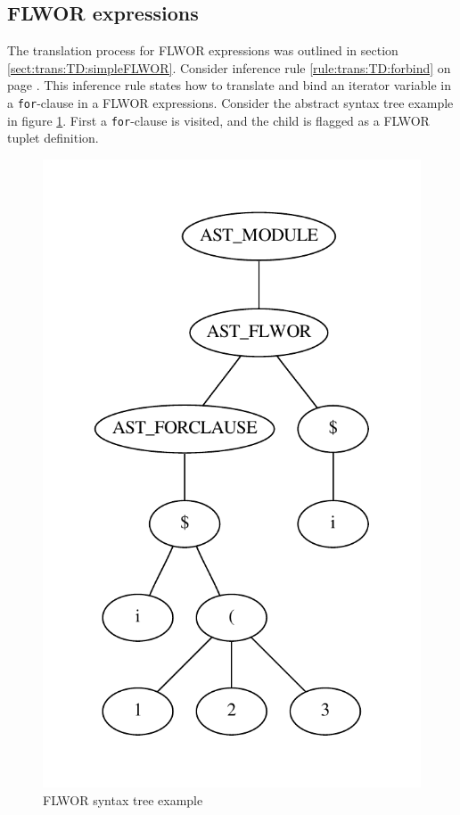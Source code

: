 \subsection{FLWOR expressions}
The translation process for FLWOR expressions was outlined in section
\ref{sect:trans:TD:simpleFLWOR}. Consider inference rule
\ref{rule:trans:TD:forbind} on page \pageref{rule:trans:TD:forbind}. This
inference rule states how to translate and bind an iterator variable in a
\texttt{for}-clause in a FLWOR expressions. Consider the abstract syntax tree example in figure
\ref{fig:impl:td:flwor2}. First a \texttt{for}-clause is visited, and the
child is flagged as a FLWOR tuplet definition.
% 

\begin{figure}[!htp]
\begin{center}
  \includegraphics[scale=0.4]{img/graphs/flwor2}
  \caption{FLWOR syntax tree example}
  \label{fig:impl:td:flwor2}
\end{center}
\end{figure} 

